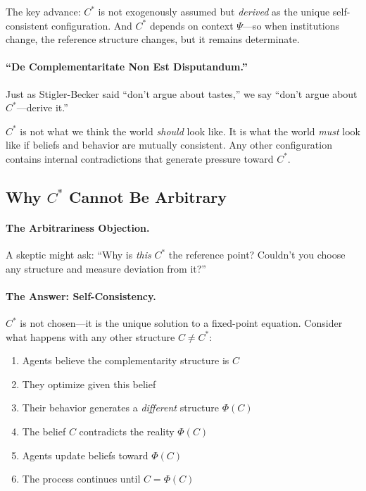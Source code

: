 \documentclass[12pt,a4paper]{article}
\begin{document}
The key advance: $C^*$ is not exogenously assumed but \emph{derived}
as the unique self-consistent configuration.
And $C^*$ depends on context $\Psi$---so when institutions change,
the reference structure changes, but it remains determinate.

\paragraph{``De Complementaritate Non Est Disputandum.''}
Just as Stigler-Becker said ``don't argue about tastes,''
we say ``don't argue about $C^*$---derive it.''

$C^*$ is not what we think the world \emph{should} look like.
It is what the world \emph{must} look like if beliefs and behavior are mutually consistent.
Any other configuration contains internal contradictions that generate pressure toward $C^*$.

\subsection{Why $C^*$ Cannot Be Arbitrary}

\paragraph{The Arbitrariness Objection.}
A skeptic might ask: ``Why is \emph{this} $C^*$ the reference point? 
Couldn't you choose any structure and measure deviation from it?''

\paragraph{The Answer: Self-Consistency.}
$C^*$ is not chosen---it is the unique solution to a fixed-point equation.
Consider what happens with any other structure $C \neq C^*$:

\begin{enumerate}
  \item Agents believe the complementarity structure is $C$
  \item They optimize given this belief
  \item Their behavior generates a \emph{different} structure $\Phi(C)$
  \item The belief $C$ contradicts the reality $\Phi(C)$
  \item Agents update beliefs toward $\Phi(C)$
  \item The process continues until $C = \Phi(C)$
\end{enumerate}
\end{document}
